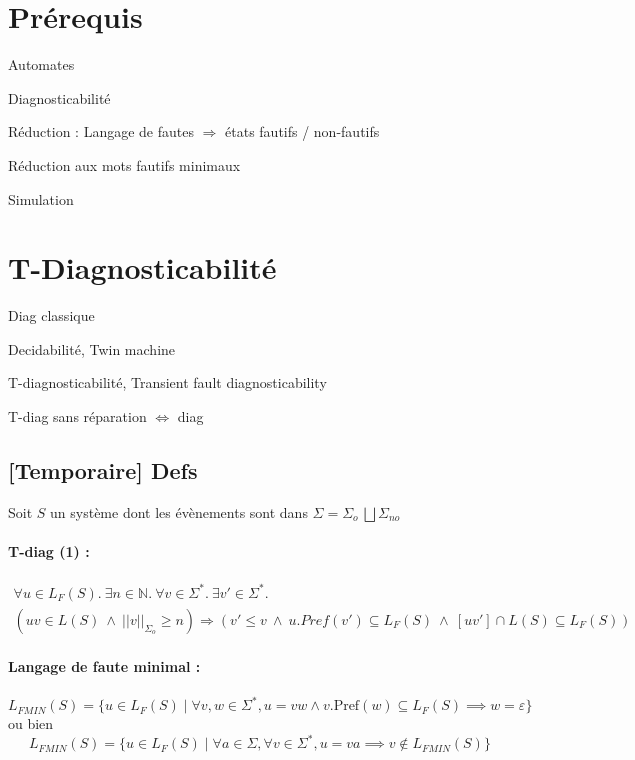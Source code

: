 \documentclass[10pt,a4paper]{article}
\begin{document}
\newpage

\section{Pr\'erequis}

Automates

Diagnosticabilit\'e

R\'eduction : Langage de fautes $\Rightarrow$ \'etats fautifs / non-fautifs

R\'eduction aux mots fautifs minimaux

Simulation

\section{T-Diagnosticabilit\'e}

Diag classique

Decidabilit\'e, Twin machine

T-diagnosticabilit\'e, Transient fault diagnosticability

T-diag sans r\'eparation $ \iff $ diag

\subsection*{[Temporaire] Defs}

Soit $S$ un système dont les évènements sont dans $\Sigma = \Sigma_o \ \bigsqcup \Sigma_{no}$
\paragraph{T-diag (1) :}

\begin{multline*}
\forall u \in L_F(S).\ \exists n \in \mathbb{N}.\ \forall v \in \Sigma^*.\ \exists v' \in \Sigma^*. \\
(uv \in L(S) \ \wedge \  ||v||_{\Sigma_o}\geq n) \Rightarrow (v'\leq v \ \wedge \  u.Pref(v') \subseteq L_F(S) \ \wedge \  [uv'] \cap L(S) \subseteq L_F(S))
\end{multline*}


\paragraph{Langage de faute minimal :}
$$L_{FMIN}(S) = \{u \in L_F(S) \mid \forall v,w \in \Sigma^*, u = vw \land v.\text{Pref}(w)\subseteq L_F(S) \implies w = \varepsilon \}$$
ou bien
$$L_{FMIN}(S) = \{u \in L_F(S) \mid \forall a \in \Sigma, \forall v \in \Sigma^*, u = va \implies v \not \in L_{FMIN}(S)\}$$
\end{document}
